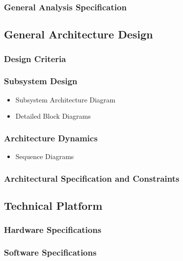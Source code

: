 	\subsubsection{General Analysis Specification}
\subsection{General Architecture Design}
	\subsubsection{Design Criteria}
	\subsubsection{Subsystem Design}
		\begin{itemize}
			\item Subsystem Architecture Diagram
			\item Detailed Block Diagrams
		\end{itemize}
	\subsubsection{Architecture Dynamics}
		\begin{itemize}
			\item Sequence Diagrams
		\end{itemize}
	\subsubsection{Architectural Specification and Constraints}
\subsection{Technical Platform}
	\subsubsection{Hardware Specifications}
	\subsubsection{Software Specifications}